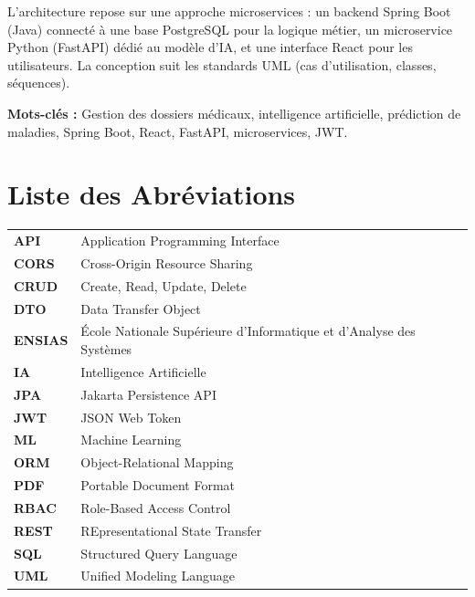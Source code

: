 \documentclass[12pt,a4paper]{report}
\begin{document}
L'architecture repose sur une approche microservices : un backend Spring Boot (Java) connecté à une base PostgreSQL pour la logique métier, un microservice Python (FastAPI) dédié au modèle d'IA, et une interface React pour les utilisateurs. La conception suit les standards UML (cas d'utilisation, classes, séquences).


\medskip
\noindent\textbf{Mots-clés :} Gestion des dossiers médicaux, intelligence artificielle,
prédiction de maladies, Spring Boot, React, FastAPI, microservices, JWT.

\chapter*{Liste des Abréviations}
\thispagestyle{fancy}

\begin{tabular}{p{2.5cm}p{11cm}}
\textbf{API}     & Application Programming Interface \\[4pt]
\textbf{CORS}    & Cross-Origin Resource Sharing \\[4pt]
\textbf{CRUD}    & Create, Read, Update, Delete \\[4pt]
\textbf{DTO}     & Data Transfer Object \\[4pt]
\textbf{ENSIAS}  & École Nationale Supérieure d'Informatique et d'Analyse des Systèmes \\[4pt]
\textbf{IA}      & Intelligence Artificielle \\[4pt]
\textbf{JPA}     & Jakarta Persistence API \\[4pt]
\textbf{JWT}     & JSON Web Token \\[4pt]
\textbf{ML}      & Machine Learning \\[4pt]
\textbf{ORM}     & Object-Relational Mapping \\[4pt]
\textbf{PDF}     & Portable Document Format \\[4pt]
\textbf{RBAC}    & Role-Based Access Control \\[4pt]
\textbf{REST}    & REpresentational State Transfer \\[4pt]
\textbf{SQL}     & Structured Query Language \\[4pt]
\textbf{UML}     & Unified Modeling Language \\[4pt]
\end{tabular}
\end{document}
